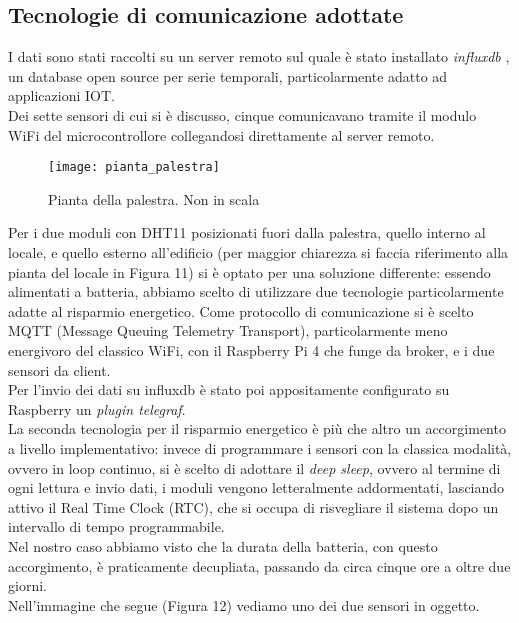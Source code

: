 \documentclass[fleqn,10pt]{SelfArx} %
\begin{document}
\subsection{Tecnologie di comunicazione adottate}

I dati sono stati raccolti su un server remoto sul quale è stato installato \textit{influxdb} \cite{influxdb}, un database 
open source per serie temporali, particolarmente adatto ad applicazioni IOT.\\

Dei sette sensori di cui si è discusso, cinque comunicavano tramite il modulo WiFi del microcontrollore collegandosi 
direttamente al server remoto.\\

\begin{figure}[htb!]\centering
	\texttt{[image: pianta\_palestra]}
	\caption{Pianta della palestra. Non in scala}
	\label{fig:pianta palestra}
\end{figure}

Per i due moduli con DHT11 posizionati fuori dalla palestra, quello interno al locale, e quello esterno all'edificio 
(per maggior chiarezza si faccia riferimento alla pianta del locale in Figura 11) si è optato per una soluzione 
differente: essendo alimentati a batteria, abbiamo scelto di utilizzare due tecnologie particolarmente adatte al 
risparmio energetico. Come protocollo di comunicazione si è scelto MQTT \cite{mqtt} (Message Queuing Telemetry Transport), 
particolarmente meno energivoro del classico WiFi, con il Raspberry Pi 4 che funge da broker, e i due sensori da client. \\
Per l'invio dei dati su influxdb è stato poi appositamente configurato su Raspberry un \textit{plugin telegraf}.\\

La seconda tecnologia per il risparmio energetico è più che altro un accorgimento a livello implementativo: invece di 
programmare i sensori con la classica modalità, ovvero in loop continuo, si è scelto di adottare il \textit{deep sleep}, 
ovvero al termine di ogni lettura e invio dati, i moduli vengono letteralmente addormentati, lasciando attivo il Real 
Time Clock (RTC), che si occupa di risvegliare il sistema dopo un intervallo di tempo programmabile.\\
Nel nostro caso abbiamo visto che la durata della batteria, con questo accorgimento, è praticamente decupliata, 
passando da circa cinque ore a oltre due giorni.\\
Nell'immagine che segue (Figura 12) vediamo uno dei due sensori in oggetto.
\end{document}
